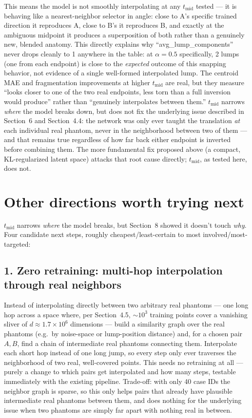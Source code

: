 \documentclass[11pt]{article}
\newcommand{\hsec}[1]{\section*{\color{hdrblue}#1}}
\newcommand{\hsub}[1]{\subsection*{#1}}
\begin{document}
This means the model is not smoothly interpolating at any $t_{\text{mid}}$ tested --- it is
behaving like a nearest-neighbor selector in angle: close to A's specific trained direction it
reproduces A, close to B's it reproduces B, and exactly at the ambiguous midpoint it produces
a superposition of both rather than a genuinely new, blended anatomy. This directly explains
why ``avg\_lump\_components'' never drops cleanly to 1 anywhere in the table: at $\alpha=0.5$
specifically, 2 lumps (one from each endpoint) is close to the \emph{expected} outcome of this
snapping behavior, not evidence of a single well-formed interpolated lump. The centroid MAE
and fragmentation improvements at higher $t_{\text{mid}}$ are real, but they measure ``looks
closer to one of the two real endpoints, less torn than a full inversion would produce''
rather than ``genuinely interpolates between them.'' $t_{\text{mid}}$ narrows \emph{where}
the model breaks down, but does not fix the underlying issue described in Section~6 and
Section~4.4: the network was only ever taught the translation \emph{at} each individual real
phantom, never in the neighborhood between two of them --- and that remains true regardless
of how far back either endpoint is inverted before combining them. The more fundamental fix
proposed above (a compact, KL-regularized latent space) attacks that root cause directly;
$t_{\text{mid}}$, as tested here, does not.

\hsec{Other directions worth trying next}
$t_{\text{mid}}$ narrows \emph{where} the model breaks, but Section~8 showed it doesn't touch
\emph{why}. Four candidate next steps, roughly cheapest/least-certain to most
involved/most-targeted:

\hsub{1. Zero retraining: multi-hop interpolation through real neighbors}
Instead of interpolating directly between two arbitrary real phantoms --- one long hop across
a space where, per Section~4.5, $\sim\!10^3$ training points cover a vanishing sliver of
$d\approx1.7\times10^6$ dimensions --- build a similarity graph over the real phantoms (e.g.\
by noise-space or lump-position distance) and, for a chosen pair $A,B$, find a chain of
intermediate real phantoms connecting them. Interpolate each short hop instead of one long
jump, so every step only ever traverses the neighborhood of two real, well-covered points.
This needs no retraining at all --- purely a change to which pairs get interpolated and how
many steps, testable immediately with the existing pipeline. Trade-off: with only 40 case
IDs the neighbor graph is sparse, so this only helps pairs that already have plausible
intermediate real phantoms between them, and does nothing for the underlying issue when two
phantoms are simply far apart with nothing real in between.
\end{document}
